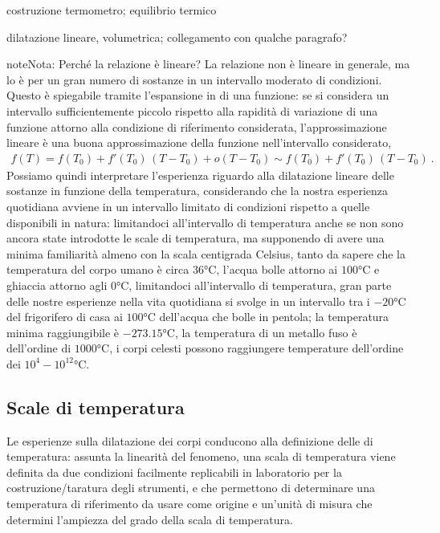 \documentclass[letterpaper,10pt,italian]{jupyterBook}
\begin{document}
\sphinxAtStartPar
{} costruzione termometro; equilibrio termico

\sphinxAtStartPar
{} dilatazione lineare, volumetrica; collegamento con qualche paragrafo?

\begin{sphinxadmonition}{note}{Nota:}
\sphinxAtStartPar
Perché la relazione è lineare?
La relazione non è lineare in generale, ma lo è per un gran numero di sostanze in un intervallo moderato di condizioni. Questo è spiegabile tramite l’espansione in  di una funzione: se si considera un intervallo sufficientemente piccolo rispetto alla rapidità di variazione di una funzione attorno alla condizione di riferimento considerata, l’approssimazione lineare è una buona approssimazione della funzione nell’intervallo considerato,
\begin{equation*}
\begin{split}f(T) = f(T_0) + f'(T_0) \, ( T - T_0 ) + o(T-T_0) \sim f(T_0) + f'(T_0) \, ( T - T_0 ) \ .\end{split}
\end{equation*}
\sphinxAtStartPar
Possiamo quindi interpretare l’esperienza riguardo alla dilatazione lineare delle sostanze in funzione della temperatura, considerando che la nostra esperienza quotidiana avviene in un intervallo limitato di condizioni rispetto a quelle disponibili in natura: limitandoci all’intervallo di temperatura anche se non sono ancora state introdotte le scale di temperatura, ma supponendo di avere una minima familiarità almeno con la scala centigrada Celsius, tanto da sapere che la temperatura del corpo umano è circa \(36\text{°C}\), l’acqua bolle attorno ai \(100\text{°C}\) e ghiaccia attorno agli \(0\text{°C}\), limitandoci all’intervallo di temperatura, gran parte delle nostre esperienze nella vita quotidiana si svolge in un intervallo tra i \(-20\text{°C}\) del frigorifero di casa ai \(100\text{°C}\) dell’acqua che bolle in pentola; la temperatura minima raggiungibile è \(-273.15\text{°C}\), la temperatura di un metallo fuso è dell’ordine di \(1000\text{°C}\), i corpi celesti possono raggiungere temperature dell’ordine dei \(10^4-10^{12}\text{°C}\).
\end{sphinxadmonition}


\subsection{Scale di temperatura}
\label{\detokenize{ch/thermodynamics/foundation-experiments:scale-di-temperatura}}\label{\detokenize{ch/thermodynamics/foundation-experiments:physics-hs-thermodynamics-foundation-experiments-t-scales}}
\sphinxAtStartPar
{} Le esperienze sulla dilatazione dei corpi conducono alla definizione delle  di temperatura: assunta la linearità del fenomeno, una scala di temperatura viene definita da due condizioni facilmente replicabili in laboratorio per la costruzione/taratura degli strumenti, e che permettono di determinare una temperatura di riferimento da usare come origine e un’unità di misura che determini l’ampiezza del grado della scala di temperatura.
\end{document}
